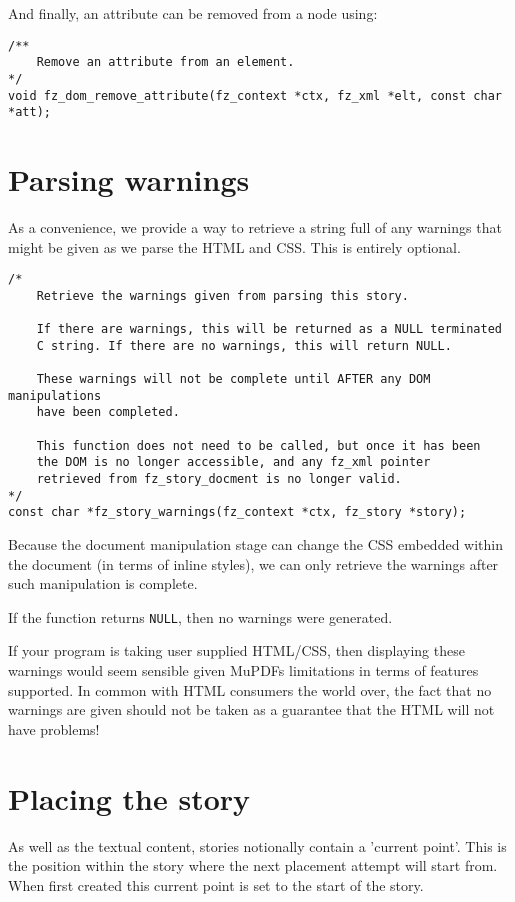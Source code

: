\documentclass[oneside]{book}
\begin{document}
And finally, an attribute can be removed from a node using:

\begin{lstlisting}
/**
	Remove an attribute from an element.
*/
void fz_dom_remove_attribute(fz_context *ctx, fz_xml *elt, const char *att);
\end{lstlisting}

\section{Parsing warnings}

As a convenience, we provide a way to retrieve a string full of any warnings that might be given as we parse the HTML and CSS. This is entirely optional.

\begin{lstlisting}
/*
	Retrieve the warnings given from parsing this story.

	If there are warnings, this will be returned as a NULL terminated
	C string. If there are no warnings, this will return NULL.

	These warnings will not be complete until AFTER any DOM manipulations
	have been completed.

	This function does not need to be called, but once it has been
	the DOM is no longer accessible, and any fz_xml pointer
	retrieved from fz_story_docment is no longer valid.
*/
const char *fz_story_warnings(fz_context *ctx, fz_story *story);
\end{lstlisting}

Because the document manipulation stage can change the CSS embedded within the document (in terms of inline styles), we can only retrieve the warnings after such manipulation is complete.

If the function returns \texttt{NULL}, then no warnings were generated.

If your program is taking user supplied HTML/CSS, then displaying these warnings would seem sensible given MuPDFs limitations in terms of features supported. In common with HTML consumers the world over, the fact that no warnings are given should not be taken as a guarantee that the HTML will not have problems!

\section{Placing the story}

As well as the textual content, stories notionally contain a
'current point'. This is the position within the story where the next placement attempt will start from. When first created this current point is set to the start of the story.
\end{document}
